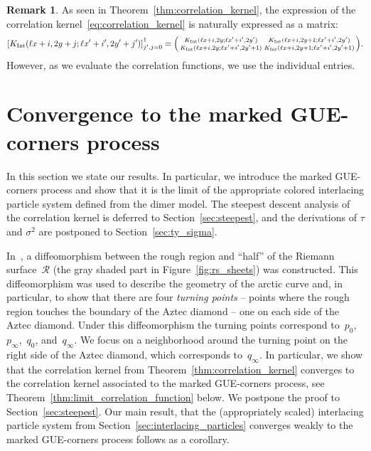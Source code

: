 \documentclass[11pt]{article}
\theoremstyle{plain}
\theoremstyle{definition}
\newtheorem{remark}[theorem]{Remark}
\numberwithin{equation}{section}
\begin{document}
\begin{remark}
As seen in Theorem~\ref{thm:correlation_kernel}, the expression of the correlation kernel~\eqref{eq:correlation_kernel} is naturally expressed as a matrix:
\begin{equation}
\left[K_{\operatorname{Int}}(\ell x+i,2y+j;\ell x'+i',2y'+j')\right]_{j',j=0}^1=
\begin{psmallmatrix}
K_{\operatorname{Int}}(\ell x+i,2y;\ell x'+i',2y') & K_{\operatorname{Int}}(\ell x+i,2y+1;\ell x'+i',2y') \\
K_{\operatorname{Int}}(\ell x+i,2y;\ell x'+i',2y'+1) & K_{\operatorname{Int}}(\ell x+i,2y+1;\ell x'+i',2y'+1)
\end{psmallmatrix}.
\end{equation}
However, as we evaluate the correlation functions, we use the individual entries. 
\end{remark}


\section{Convergence to the marked GUE-corners process}\label{sec:main}
In this section we state our results. In particular, we introduce the marked GUE-corners process and show that it is the limit of the appropriate colored interlacing particle system defined from the dimer model. The steepest descent analysis of the correlation kernel is deferred to Section~\ref{sec:steepest}, and the derivations of $\tau$ and $\sigma^2$ are postponed to Section~\ref{sec:ty_sigma}.

In~\cite{Ber21}, a diffeomorphism between the rough region and ``half'' of the Riemann surface~$\mathcal R$ (the gray shaded part in Figure~\ref{fig:rs_sheets}) was constructed. This diffeomorphism was used to describe the geometry of the arctic curve and, in particular, to show that there are four \emph{turning points} -- points where the rough region touches the boundary of the Aztec diamond -- one on each side of the Aztec diamond. Under this diffeomorphism the turning points correspond to~$p_0$,~$p_\infty$,~$q_0$, and~$q_\infty$. We focus on a neighborhood around the turning point on the right side of the Aztec diamond, which corresponds to~$q_\infty$. In particular, we show that the correlation kernel from Theorem~\ref{thm:correlation_kernel} converges to the correlation kernel associated to the marked GUE-corners process, see Theorem~\ref{thm:limit_correlation_function} below. We postpone the proof to Section~\ref{sec:steepest}. Our main result, that the (appropriately scaled) interlacing particle system from Section~\ref{sec:interlacing_particles} converges weakly to the marked GUE-corners process follows as a corollary.  
\end{document}

